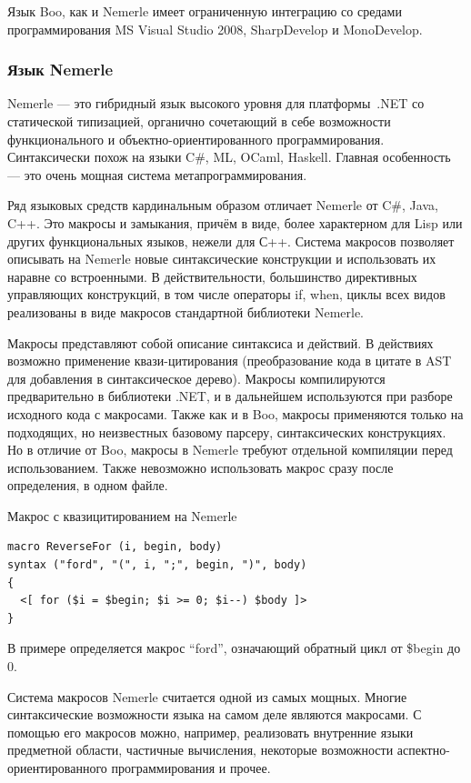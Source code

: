 \documentclass[a4paper,12pt,titlepage]{extarticle}
\begin{document}
Язык Boo, как и Nemerle имеет ограниченную интеграцию со средами программирования
MS Visual Studio 2008, SharpDevelop и MonoDevelop.

\subsubsection*{Язык Nemerle}
Nemerle — это гибридный язык высокого уровня для платформы~.NET со статической
типизацией, органично сочетающий в себе возможности функционального и
объектно-ориентированного программирования. Синтаксически похож на языки C\#,
ML, OCaml, Haskell. Главная особенность --- это очень мощная система
метапрограммирования.

Ряд языковых средств кардинальным образом отличает Nemerle от C\#, Java, C++.
Это макросы и замыкания, причём в виде, более характерном для Lisp или других
функциональных языков, нежели для С++. Система макросов позволяет описывать на
Nemerle новые синтаксические конструкции и использовать их наравне со
встроенными. В действительности, большинство директивных управляющих
конструкций, в том числе операторы if, when, циклы всех видов реализованы в
виде макросов стандартной библиотеки Nemerle.

Макросы представляют собой описание синтаксиса и действий. В действиях
возможно применение квази-цитирования (преобразование кода в цитате в AST для
добавления в синтаксическое дерево). Макросы компилируются предварительно в
библиотеки .NET, и в дальнейшем используются при разборе исходного кода с
макросами. Также как и в Boo, макросы применяются только на подходящих, но
неизвестных базовому парсеру, синтаксических конструкциях. Но в отличие от Boo,
макросы в Nemerle требуют отдельной компиляции перед использованием. Также
невозможно использовать макрос сразу после определения, в одном файле.

Макрос с квазицитированием на Nemerle
\begin{verbatim}
macro ReverseFor (i, begin, body) 
syntax ("ford", "(", i, ";", begin, ")", body)
{
  <[ for ($i = $begin; $i >= 0; $i--) $body ]>
}
\end{verbatim}
В примере определяется макрос ``ford'', означающий обратный цикл от \$begin до
0.

Система макросов Nemerle считается одной из самых мощных. Многие
синтаксические возможности языка на самом деле являются макросами. С помощью
его макросов можно, например, реализовать внутренние языки предметной области,
частичные вычисления, некоторые возможности аспектно-ориентированного
программирования и прочее.
\end{document}

